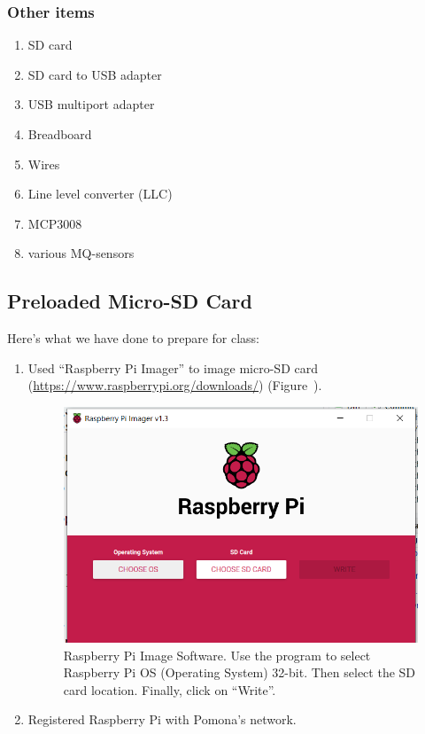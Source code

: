 \documentclass{article}
\begin{document}
\subsubsection{Other items}

\begin{enumerate}[noitemsep]
  \item SD card
  \item SD card to USB adapter
  \item USB multiport adapter
  \item Breadboard
  \item Wires
  \item Line level converter (LLC)
  \item MCP3008
  \item various MQ-sensors

\end{enumerate}

\subsection{Preloaded Micro-SD Card}

Here's what we have done to prepare for class:

\begin{enumerate}
  \item Used ``Raspberry Pi Imager'' to image micro-SD card (\url{https://www.raspberrypi.org/downloads/}) (Figure~\label{fig:pi_imager}).
  
\begin{figure}
\centering
\includegraphics[width=1.00\textwidth]{1_Pi_Imager}
\caption{Raspberry Pi Image Software. Use the program to select Raspberry Pi OS (Operating System) 32-bit. Then select the SD card location. Finally, click on ``Write''.}
\label{fig:pi_imager}
\end{figure}

  \item Registered Raspberry Pi with Pomona's network.
\end{enumerate}
\end{document}
